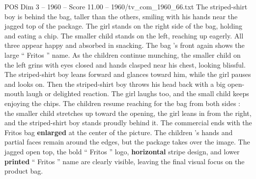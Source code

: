 \begin{textsample}{POS Dim 3 – 1960 – Score 11.00 – 1960/tv\_com\_1960\_66.txt}
The striped-shirt boy is behind the bag, taller than the others, smiling with his hands near the jagged top of the package.
The girl stands on the right side of the bag, holding and eating a chip.
The smaller child stands on the left, reaching up eagerly.
All three appear happy and absorbed in snacking.
The bag ’s front again shows the large “ Fritos ” name.
As the children continue munching, the smaller child on the left grins with eyes closed and hands clasped near his chest, looking blissful.
The striped-shirt boy leans forward and glances toward him, while the girl pauses and looks on.
Then the striped-shirt boy throws his head back with a big open-mouth laugh or delighted reaction.
The girl laughs too, and the small child keeps enjoying the chips.
The children resume reaching for the bag from both sides : the smaller child stretches up toward the opening, the girl leans in from the right, and the striped-shirt boy stands proudly behind it.
The commercial ends with the Fritos bag \textbf{enlarged} at the center of the picture.
The children ’s hands and partial faces remain around the edges, but the package takes over the image.
The jagged open top, the bold “ Fritos ” logo, \textbf{horizontal} stripe design, and lower \textbf{printed} “ Fritos ” name are clearly visible, leaving the final visual focus on the product bag.

\end{textsample}
